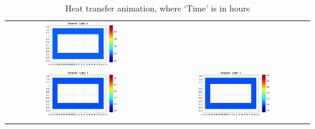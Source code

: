 \documentclass{article}
\begin{document}
\begin{center}
\begin{longtable}{c  c}
    \includegraphics[width=0.5\textwidth]{./img/a16.png} \\
    \includegraphics[width=0.5\textwidth]{./img/a20.png} &
    \includegraphics[width=0.5\textwidth]{./img/a24.png} \\
\caption{Heat transfer animation, where `Time' is in hours}
\label{tb_heatTransferAnimation}
\end{longtable}
\end{center}


\end{document}
